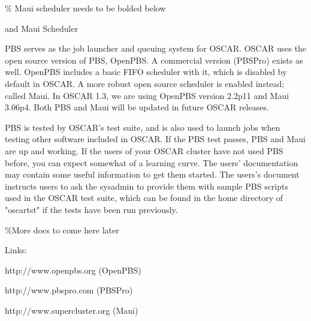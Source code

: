 \documentclass{letter}
\newcommand{\subsection}[1]{\tmsection{\Large #1}}
\begin{document}
\% Maui scheduler needs to be bolded below

\subsection{The Portable Batch System (PBS)}\label{app:pbs-overview} and Maui
Scheduler

PBS serves as the job launcher and queuing system for OSCAR.  OSCAR uses the
open source version of PBS, OpenPBS.  A commercial version (PBSPro) exists as
well.  OpenPBS includes a basic FIFO scheduler with it, which is disabled by
default in OSCAR.  A more robust open source scheduler is enabled instead;
called Maui.  In OSCAR 1.3, we are using OpenPBS version 2.2p11 and Maui
3.06p4.  Both PBS and Maui will be updated in future OSCAR releases.

PBS is tested by OSCAR's test suite, and is also used to launch jobs when
testing other software included in OSCAR.  If the PBS test passes, PBS and
Maui are up and working.  If the users of your OSCAR cluster have not used PBS
before, you can expect somewhat of a learning curve.  The users' documentation
may contain some useful information to get them started.  The users's document
instructs users to ask the sysadmin to provide them with sample PBS scripts
used in the OSCAR test suite, which can be found in the home directory of
"oscartst" if the tests have been run previously.



\%More docs to come here later



Links:

http://www.openpbs.org  (OpenPBS)

http://www.pbspro.com  (PBSPro)

http://www.supercluster.org  (Maui)
\end{document}
